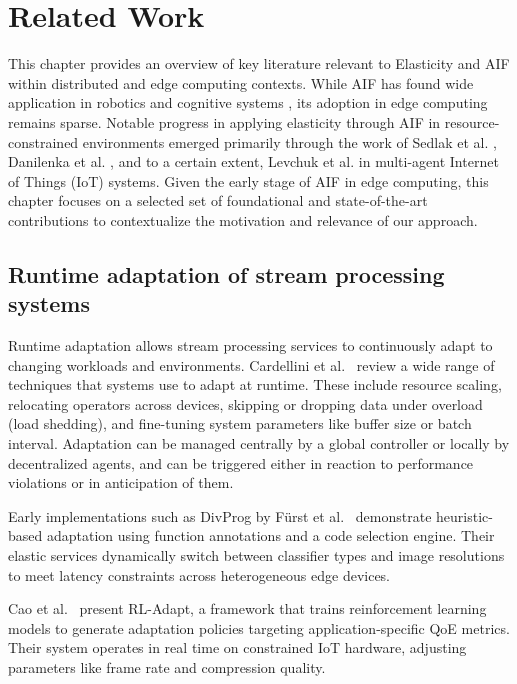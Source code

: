 \chapter{Related Work}
\label{chap:related-work}
This chapter provides an overview of key literature relevant to Elasticity and AIF within distributed and edge computing contexts. While AIF has found wide application in robotics and cognitive systems \cite{lanillos_active_2021}, its adoption in edge computing remains sparse. Notable progress in applying elasticity through AIF in resource-constrained environments emerged primarily through the work of Sedlak et al. \cite{sedlak_adaptive_2024, sedlak_equilibrium_2024, sedlak_active_2024, sedlak_slo-aware_2025, lapkovskis_benchmarking_2025, sedlak_towards_2025}, Danilenka et al. \cite{danilenka_adaptive_2025}, and to a certain extent, Levchuk et al. \cite{levchuk_active_2019} in multi-agent Internet
of Things (IoT) systems. Given the early stage of AIF in edge computing, this chapter focuses on a selected set of foundational and state-of-the-art contributions to contextualize the motivation and relevance of our approach.

\section{Runtime adaptation of stream processing systems}
Runtime adaptation allows stream processing services to continuously adapt to changing workloads and environments. Cardellini et al.~\cite{cardellini_runtime_2022} review a wide range of techniques that systems use to adapt at runtime. These include resource scaling, relocating operators across devices, skipping or dropping data under overload (load shedding), and fine-tuning system parameters like buffer size or batch interval. Adaptation can be managed centrally by a global controller or locally by decentralized agents, and can be triggered either in reaction to performance violations or in anticipation of them.

Early implementations such as DivProg by Fürst et al.~\cite{furst_elastic_2018} demonstrate heuristic-based adaptation using function annotations and a code selection engine. Their elastic services dynamically switch between classifier types and image resolutions to meet latency constraints across heterogeneous edge devices.

Cao et al.~\cite{cao_neural_2023} present RL-Adapt, a framework that trains reinforcement learning models to generate adaptation policies targeting application-specific QoE metrics. Their system operates in real time on constrained IoT hardware, adjusting parameters like frame rate and compression quality.

